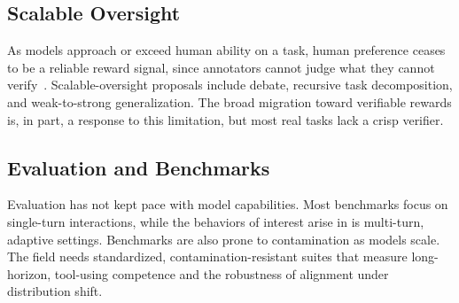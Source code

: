 \subsection{Scalable Oversight}

As models approach or exceed human ability on a task, human preference
ceases to be a reliable reward signal, since annotators cannot judge what they
cannot verify~\cite{casper2023open}. Scalable-oversight proposals include
debate, recursive task decomposition, and weak-to-strong generalization.
The broad migration toward verifiable rewards is, in part, a response to
this limitation, but most real tasks lack a crisp verifier.

\subsection{Evaluation and Benchmarks}

Evaluation has not kept pace with model capabilities. Most benchmarks focus on single-turn interactions,
while the behaviors of interest arise in is multi-turn, adaptive settings. Benchmarks are also prone to contamination as models scale. The field needs
standardized, contamination-resistant suites that measure long-horizon, tool-using competence and the robustness of alignment under distribution
shift.

